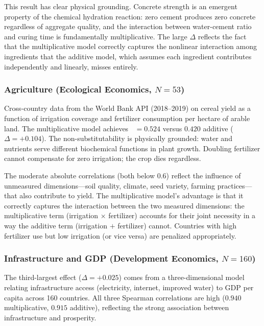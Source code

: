 \documentclass[12pt, a4paper]{article}
\theoremstyle{definition}
\theoremstyle{remark}
\DeclareMathOperator{\Spearman}{\rho_s}
\begin{document}
This result has clear physical grounding. Concrete strength is an emergent property of the chemical hydration reaction: zero cement produces zero concrete regardless of aggregate quality, and the interaction between water-cement ratio and curing time is fundamentally multiplicative. The large $\Delta$ reflects the fact that the multiplicative model correctly captures the nonlinear interaction among ingredients that the additive model, which assumes each ingredient contributes independently and linearly, misses entirely.

\subsubsection{Agriculture (Ecological Economics, $N = 53$)}

Cross-country data from the World Bank API (2018--2019) on cereal yield as a function of irrigation coverage and fertilizer consumption per hectare of arable land. The multiplicative model achieves $\Spearman = 0.524$ versus $0.420$ additive ($\Delta = +0.104$). The non-substitutability is physically grounded: water and nutrients serve different biochemical functions in plant growth. Doubling fertilizer cannot compensate for zero irrigation; the crop dies regardless.

The moderate absolute correlations (both below 0.6) reflect the influence of unmeasured dimensions---soil quality, climate, seed variety, farming practices---that also contribute to yield. The multiplicative model's advantage is that it correctly captures the interaction between the two measured dimensions: the multiplicative term (irrigation $\times$ fertilizer) accounts for their joint necessity in a way the additive term (irrigation $+$ fertilizer) cannot. Countries with high fertilizer use but low irrigation (or vice versa) are penalized appropriately.

\subsubsection{Infrastructure and GDP (Development Economics, $N = 160$)}

The third-largest effect ($\Delta = +0.025$) comes from a three-dimensional model relating infrastructure access (electricity, internet, improved water) to GDP per capita across 160 countries. All three Spearman correlations are high ($0.940$ multiplicative, $0.915$ additive), reflecting the strong association between infrastructure and prosperity.
\end{document}
